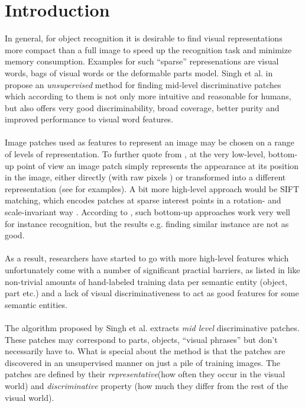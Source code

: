 \section{Introduction}

In general, for object recognition it is desirable to find visual representations more compact than a full image to 
speed up the recognition task and minimize memory consumption. Examples for such ``sparse'' represenations are visual words,
bags of visual words or the deformable parts model. Singh et al. in \cite{Singh2012DiscPat} propose an \textit{unsupervised} method for finding mid-level
discriminative patches which according to them is not only more intuitive and reasonable for humans, but also offers very good discriminability,
broad coverage, better purity and improved performance to visual word features.\\
\\
Image patches used as features to represent an image may be chosen on a range of levels of representation.
To further quote from \cite{Singh2012DiscPat}, at the very low-level, bottom-up point of view an image patch simply represents
the appearance at its position in the image, either directly (with raw pixels \cite{Ulman2002VisualFeatures}) or transformed into a different representation (see \cite{Singh2012DiscPat} for examples).
A bit more high-level approach would be SIFT matching, which encodes patches at sparse interest points in a rotation- and scale-invariant 
way \cite{Lowe2004SIFT}. According to \cite{Singh2012DiscPat}, such bottom-up approaches work very well for instance recognition, but the results 
e.g. finding similar instance are not as good.\\
\\
As a result, researchers have started to go with more high-level features which unfortunately come with a number of significant practial barriers,
as listed in \cite{Sing2012DiscPat} like non-trivial amounts of hand-labeled training data per semantic entity (object, part etc.) and a lack
of visual discriminativeness to act as good features for some semantic entities.\\
\\
The algorithm proposed by Singh et al. extracts \textit{mid level} discriminative patches. These patches may correspond to parts, objects, ``visual phrases''
but don't necessarily have to. What is special about the method is that the patches are discovered in an unsupervised manner on just a pile of training images.
The patches are defined by their \textit{representative}(how often they occur in the visual world) and \textit{discriminative} property (how much they differ from the rest of the visual world).
